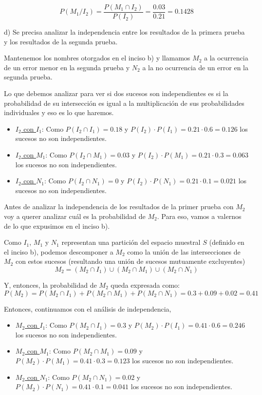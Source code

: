 \documentclass[11pt]{article}
\begin{document}
\[P(M_{1}/I_{2}) = \frac{P(M_{1}\cap I_{2})}{P(I_{2})} = \frac{0.03}{0.21} = 0.1428\]

d) Se precisa analizar la independencia entre los resultados de la primera prueba y los resultados de la segunda prueba. 

Mantenemos los nombres otorgados en el inciso b) y llamamos $M_{2}$ a la ocurrencia de un error menor en la segunda prueba y $N_{2}$ a la no ocurrencia de un error en la segunda prueba. 

Lo que debemos analizar para ver si dos sucesos son independientes es si la probabilidad de su intersección es igual a la multiplicación de sus probabilidades individuales y eso es lo que haremos. 

\begin{itemize}
    \item \underline{$I_{2}$ con $I_{1}$}: Como $P(I_{2}\cap I_{1}) = 0.18$ y $P(I_{2})\cdot P(I_{1}) = 0.21\cdot 0.6 = 0.126$ los sucesos no son independientes. 
    \item \underline{$I_{2}$ con $M_{1}$}: Como $P(I_{2}\cap M_{1}) = 0.03$ y $P(I_{2})\cdot P(M_{1}) = 0.21\cdot 0.3 = 0.063$ los sucesos no son independientes. 
    \item \underline{$I_{2}$ con $N_{1}$}: Como $P(I_{2}\cap N_{1}) = 0$ y $P(I_{2})\cdot P(N_{1}) = 0.21\cdot 0.1 = 0.021$ los sucesos no son independientes. 
\end{itemize}

Antes de analizar la independencia de los resultados de la primer prueba con $M_{2}$ voy a querer analizar cu\'al es la probabilidad de $M_{2}$. Para eso, vamos a valernos de lo que expusimos en el inciso b). 

Como $I_{1}$, $M_{1}$ y $N_{1}$ representan una partici\'on del espacio muestral $S$ (definido en el inciso b), podemos descomponer a $M_{2}$ como la uni\'on de las intersecciones de $M_{2}$ con estos sucesos (resultando una uni\'on de sucesos mutuamente excluyentes)
\[M_{2} = (M_{2} \cap I_{1}) \cup (M_{2} \cap M_{1}) \cup (M_{2} \cap N_{1}) \]

Y, entonces, la probabilidad de $M_{2}$ queda expresada como: 
\[P(M_{2}) = P(M_{2}\cap I_{1}) + P(M_{2}\cap M_{1}) + P(M_{2}\cap N_{1}) = 0.3 + 0.09 + 0.02 = 0.41 \]

Entonces, continuamos con el an\'alisis de independencia,

\begin{itemize}
    \item \underline{$M_{2}$ con $I_{1}$}: Como $P(M_{2}\cap I_{1}) = 0.3$ y $P(M_{2})\cdot P(I_{1}) = 0.41\cdot 0.6 = 0.246$ los sucesos no son independientes. 
    \item \underline{$M_{2}$ con $M_{1}$}: Como $P(M_{2}\cap M_{1}) = 0.09$ y $P(M_{2})\cdot P(M_{1}) = 0.41\cdot 0.3 = 0.123$ los sucesos no son independientes. 
    \item \underline{$M_{2}$ con $N_{1}$}: Como $P(M_{2}\cap N_{1}) = 0.02$ y $P(M_{2})\cdot P(N_{1}) = 0.41\cdot 0.1 = 0.041$ los sucesos no son independientes. 
\end{itemize}
\end{document}
